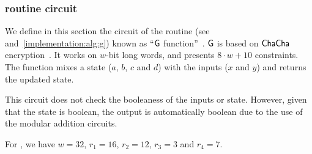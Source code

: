 \subsubsection{ routine circuit}\label{implementation:efficiency:blake:g-circuit}

We define in this section the circuit of the  routine (see~\cite[Section 3.1]{blakecompietf} and~\cref{implementation:alg:g}) known as ``$\mathsf{G}$ function''~\cite[Section 2.4]{aumasson2013blake2}. $\mathsf{G}$ is based on $\mathsf{ChaCha}$ encryption~\cite{bernstein2008chacha}. It works on $w$-bit long words, and presents $8 \cdot w+10$ constraints. The function mixes a state ($a$, $b$, $c$ and $d$) with the inputs ($x$ and $y$) and returns the updated state.

This circuit does not check the booleaness of the inputs or state. However, given that the state is boolean, the output is automatically boolean due to the use of the modular addition circuits.

For , we have $w=32$, $r_1=16$, $r_2 = 12$, $r_3=3$ and $r_4=7$.


